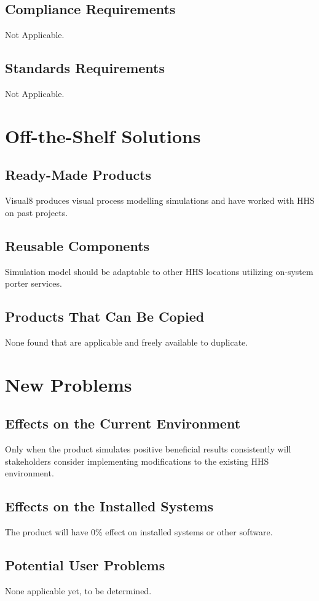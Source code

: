 \documentclass[paper=letter, fontsize=10pt]{scrartcl}
\numberwithin{equation}{section}		%
\numberwithin{figure}{section}			%
\numberwithin{table}{section}				%
\begin{document}
\subsection{Compliance Requirements}
Not Applicable.
\subsection{Standards Requirements}
Not Applicable.

\section{Off-the-Shelf Solutions}
\subsection{Ready-Made Products}
Visual8 produces visual process modelling simulations and have worked with HHS on past projects.
\subsection{Reusable Components}
Simulation model should be adaptable to other HHS locations utilizing on-system porter services.
\subsection{Products That Can Be Copied}
None found that are applicable and freely available to duplicate.

\section{New Problems}
\subsection{Effects on the Current Environment}
Only when the product simulates positive beneficial results consistently will stakeholders consider implementing modifications to the existing HHS environment.
\subsection{Effects on the Installed Systems}
The product will have 0\% effect on installed systems or other software.
\subsection{Potential User Problems}
None applicable yet, to be determined.
\end{document}

